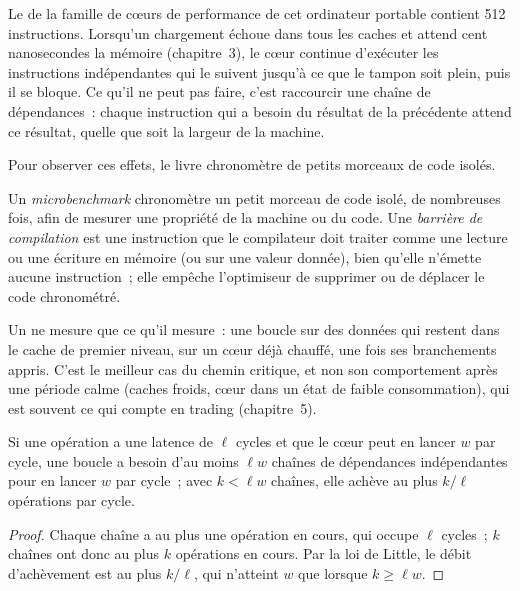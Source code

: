 Le  de la famille de cœurs de performance de cet ordinateur portable contient 512 instructions. Lorsqu'un chargement échoue
dans tous les caches et attend cent nanosecondes la mémoire (chapitre~3), le cœur continue d'exécuter les instructions indépendantes qui
le suivent jusqu'à ce que le tampon soit plein, puis il se bloque. Ce qu'il ne peut pas faire, c'est raccourcir une chaîne de dépendances~: chaque
instruction qui a besoin du résultat de la précédente attend ce résultat, quelle que soit la largeur de la machine.

Pour observer ces effets, le livre chronomètre de petits morceaux de code isolés.

\begin{definition}\label{def:ll:cpu-microarchitecture:ubench}
Un \emph{microbenchmark} chronomètre un petit morceau de code isolé, de nombreuses fois, afin de mesurer une
propriété de la machine ou du code. Une \emph{barrière de compilation} est une instruction que le compilateur
doit traiter comme une lecture ou une écriture en mémoire (ou sur une valeur donnée), bien qu'elle n'émette aucune instruction~; elle empêche
l'optimiseur de supprimer ou de déplacer le code chronométré.
\end{definition}

Un  ne mesure que ce qu'il mesure~: une boucle sur des données qui restent dans le cache de premier niveau, sur un cœur
déjà chauffé, une fois ses branchements appris. C'est le meilleur cas du chemin critique, et non son comportement après une période calme
(caches froids, cœur dans un état de faible consommation), qui est souvent ce qui compte en trading (chapitre~5).

\begin{proposition}\label{prop:ll:cpu-microarchitecture:little}
Si une opération a une latence de $\ell$ cycles et que le cœur peut en lancer $w$ par cycle, une boucle a besoin d'au moins $\ell w$
chaînes de dépendances indépendantes pour en lancer $w$ par cycle~; avec $k < \ell w$ chaînes, elle achève au plus $k/\ell$ opérations par cycle.
\end{proposition}

\begin{proof}
Chaque chaîne a au plus une opération en cours, qui occupe $\ell$ cycles~; $k$ chaînes ont donc au plus $k$ opérations en cours. Par
la loi de Little, le débit d'achèvement est au plus $k/\ell$, qui n'atteint $w$ que lorsque $k \ge \ell w$.
\end{proof}

